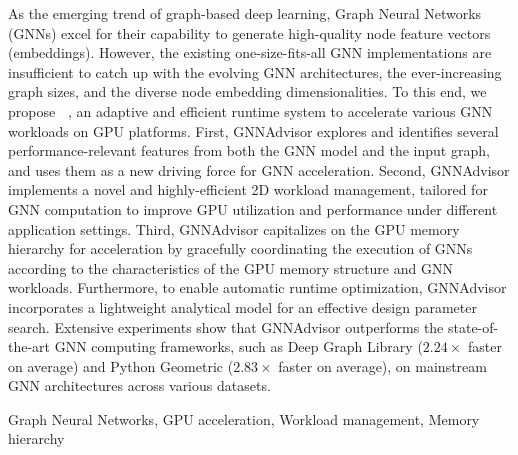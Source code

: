 \abstracten

As the emerging trend of graph-based deep learning, Graph Neural Networks (GNNs) excel for their capability to generate high-quality node feature vectors (embeddings).
%
However, the existing one-size-fits-all GNN implementations are insufficient to catch up with the evolving GNN architectures, the ever-increasing graph sizes, and the diverse node embedding dimensionalities.
%
To this end, we propose \textbf{~\Mname{}}, an adaptive and efficient runtime system to accelerate various GNN workloads on GPU platforms. 
%
First, GNNAdvisor explores and identifies several performance-relevant features from both the GNN model and the input graph, and uses them as a new driving force for GNN acceleration. 
%
Second, GNNAdvisor implements a novel and highly-efficient 2D workload management, tailored for GNN computation to improve GPU utilization and performance under different application settings.
%
Third, GNNAdvisor capitalizes on the GPU memory hierarchy for acceleration by gracefully coordinating the execution of GNNs according to the characteristics of the GPU memory structure and GNN workloads.
%
Furthermore, to enable automatic runtime optimization, GNNAdvisor incorporates a lightweight analytical model for an effective design parameter search.
%
Extensive experiments show that GNNAdvisor outperforms the state-of-the-art GNN computing frameworks, such as Deep Graph Library ($2.24\times$ faster on average) and Python Geometric ($2.83\times$ faster on average), on mainstream GNN architectures across various datasets.

\keywordsen Graph Neural Networks, GPU acceleration, Workload management, Memory hierarchy